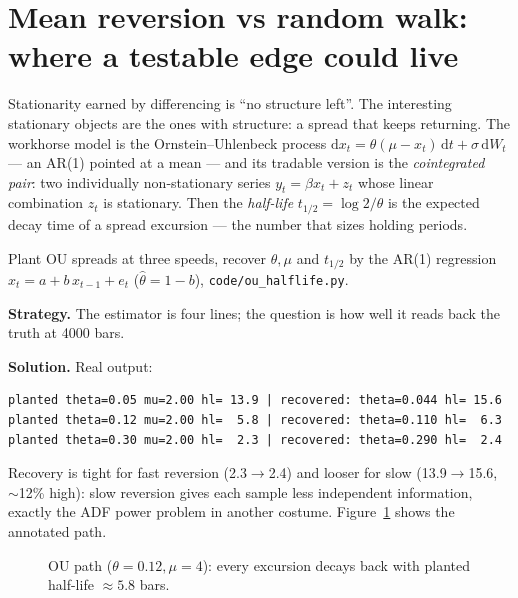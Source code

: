 \section{Mean reversion vs random walk: where a testable edge could live}\label{sec:ou}
Stationarity earned by differencing is ``no structure left''. The
interesting stationary objects are the ones with structure: a spread
that keeps returning. The workhorse model is the
Ornstein--Uhlenbeck process
$\mathrm dx_t=\theta(\mu-x_t)\,\mathrm dt+\sigma\,\mathrm dW_t$ ---
an AR(1) pointed at a mean --- and its tradable version is the
\emph{cointegrated pair}: two individually non-stationary series
$y_t=\beta x_t+z_t$ whose linear combination $z_t$ is stationary.
Then the \emph{half-life} $t_{1/2}=\log 2/\theta$ is the expected
decay time of a spread excursion --- the number that sizes holding
periods.

\begin{example}\label{ex:ouhl}
Plant OU spreads at three speeds, recover $\theta,\mu$ and
$t_{1/2}$ by the AR(1) regression $x_t=a+b\,x_{t-1}+e_t$
($\hat\theta=1-b$), \texttt{code/ou\_halflife.py}.

\textbf{Strategy.} The estimator is four lines; the question is how
well it reads back the truth at 4000 bars.

\textbf{Solution.} Real output:
\begin{lstlisting}[numbers=none]
planted theta=0.05 mu=2.00 hl= 13.9 | recovered: theta=0.044 hl= 15.6
planted theta=0.12 mu=2.00 hl=  5.8 | recovered: theta=0.110 hl=  6.3
planted theta=0.30 mu=2.00 hl=  2.3 | recovered: theta=0.290 hl=  2.4
\end{lstlisting}
Recovery is tight for fast reversion (2.3$\to$2.4) and looser for
slow (13.9$\to$15.6, $\sim$12\% high): slow reversion gives each
sample less independent information, exactly the ADF power problem
in another costume. Figure~\ref{fig:oup} shows the annotated path.
\end{example}

\begin{figure}[ht]\centering

\caption{OU path ($\theta=0.12,\mu=4$): every excursion decays back
with planted half-life $\approx5.8$ bars.}
\label{fig:oup}
\end{figure}

